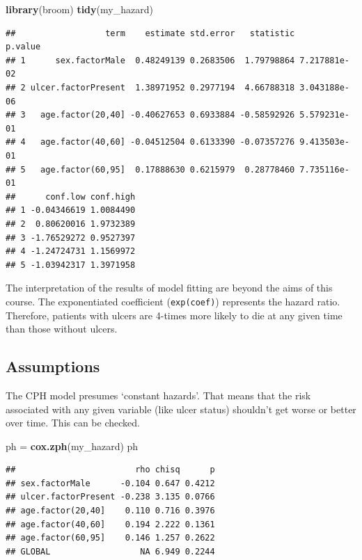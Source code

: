 \documentclass[]{book}
\makeatletter
\newenvironment{Shaded}{\begin{snugshade}}{\end{snugshade}}
\newcommand{\KeywordTok}[1]{\textcolor[rgb]{0.13,0.29,0.53}{\textbf{#1}}}
\newcommand{\StringTok}[1]{\textcolor[rgb]{0.31,0.60,0.02}{#1}}
\newcommand{\NormalTok}[1]{#1}
\newenvironment{kframe}{%
\medskip{}
\setlength{\fboxsep}{.8em}
 \def\at@end@of@kframe{}%
 \ifinner\ifhmode%
  \def\at@end@of@kframe{\end{minipage}}%
  \begin{minipage}{\columnwidth}%
 \fi\fi%
 \def\FrameCommand##1{\hskip\@totalleftmargin \hskip-\fboxsep
 \colorbox{shadecolor}{##1}\hskip-\fboxsep
     \hskip-\linewidth \hskip-\@totalleftmargin \hskip\columnwidth}%
 \MakeFramed {\advance\hsize-\width
   \@totalleftmargin\z@ \linewidth\hsize
   \@setminipage}}%
 {\par\unskip\endMakeFramed%
 \at@end@of@kframe}
\renewenvironment{Shaded}{\begin{kframe}}{\end{kframe}}
\makeatother
\begin{document}
\begin{Shaded}
\begin{Highlighting}[]
\KeywordTok{library}\NormalTok{(broom)}
\KeywordTok{tidy}\NormalTok{(my_hazard)}
\end{Highlighting}
\end{Shaded}

\begin{verbatim}
##                  term    estimate std.error   statistic      p.value
## 1      sex.factorMale  0.48249139 0.2683506  1.79798864 7.217881e-02
## 2 ulcer.factorPresent  1.38971952 0.2977194  4.66788318 3.043188e-06
## 3   age.factor(20,40] -0.40627653 0.6933884 -0.58592926 5.579231e-01
## 4   age.factor(40,60] -0.04512504 0.6133390 -0.07357276 9.413503e-01
## 5   age.factor(60,95]  0.17888630 0.6215979  0.28778460 7.735116e-01
##      conf.low conf.high
## 1 -0.04346619 1.0084490
## 2  0.80620016 1.9732389
## 3 -1.76529272 0.9527397
## 4 -1.24724731 1.1569972
## 5 -1.03942317 1.3971958
\end{verbatim}

The interpretation of the results of model fitting are beyond the aims
of this course. The exponentiated coefficient (\texttt{exp(coef)})
represents the hazard ratio. Therefore, patients with ulcers are 4-times
more likely to die at any given time than those without ulcers.

\subsection{Assumptions}\label{assumptions}

The CPH model presumes `constant hazards'. That means that the risk
associated with any given variable (like ulcer status) shouldn't get
worse or better over time. This can be checked.

\begin{Shaded}
\begin{Highlighting}[]
\NormalTok{ph =}\StringTok{ }\KeywordTok{cox.zph}\NormalTok{(my_hazard)}
\NormalTok{ph}
\end{Highlighting}
\end{Shaded}

\begin{verbatim}
##                        rho chisq      p
## sex.factorMale      -0.104 0.647 0.4212
## ulcer.factorPresent -0.238 3.135 0.0766
## age.factor(20,40]    0.110 0.716 0.3976
## age.factor(40,60]    0.194 2.222 0.1361
## age.factor(60,95]    0.146 1.257 0.2622
## GLOBAL                  NA 6.949 0.2244
\end{verbatim}
\end{document}
